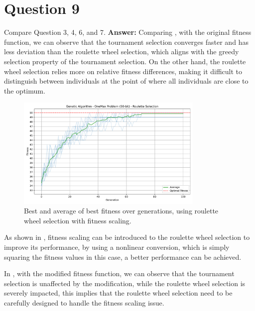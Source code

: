 \documentclass[12pt,letterpaper]{article}
\newcommand{\xAns}{\vskip 2mm\textbf{Answer:} }
\begin{document}
\section*{Question 9}
Compare Question 3, 4, 6, and 7. \xAns Comparing , with the original fitness function, we can observe that the tournament selection converges faster and has less deviation than the roulette wheel selection, which aligns with the greedy selection property of the tournament selection. On the other hand, the roulette wheel selection relies more on relative fitness differences, making it difficult to distinguish between individuals at the point of where all individuals are close to the optimum. 
\begin{figure}[H]
    \centering
    \includegraphics[width=0.8\textwidth]{images/oneMax_GA_roulette_fs.pdf}
    \caption{Best and average of best fitness over generations, using roulette wheel selection with fitness scaling.}
    \label{fig:9a}
\end{figure}
As shown in , fitness scaling can be introduced to the roulette wheel selection to improve its performance, by using a nonlinear conversion, which is simply squaring the fitness values in this case, a better performance can be achieved.

In , with the modified fitness function, we can observe that the tournament selection is unaffected by the modification, while the roulette wheel selection is severely impacted, this implies that the roulette wheel selection need to be carefully designed to handle the fitness scaling issue.
\end{document}
